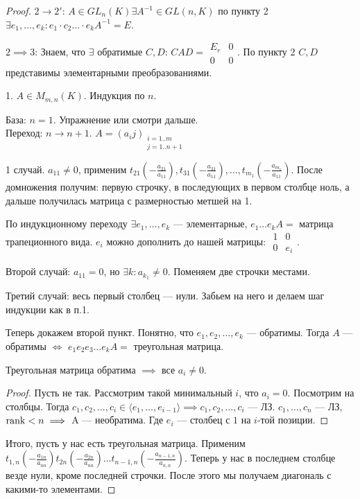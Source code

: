 \begin{proof}
    $2 \to 2'$:  $A \in GL_n(K) \exists A^{-1} \in GL(n, K)$ по пункту 2  $\exists e_1, \ldots, e_k\!: e_1 \cdot c_2 \ldots \cdot e_k A^{-1} = E$.

    $2 \implies 3$: Знаем, что  $\exists$ обратимые  $C, D$:  $CAD = \begin{array}{|c|c|} E_r & 0 \\ \hline 0 & 0 \end{array}$. По пункту 2  $C, D$ представимы элементарными преобразованиями. 

    1. $A \in M_{m, n}(K)$. Индукция по  $n$.

    База:  $n = 1$. Упражнение или смотри дальше.\\
    Переход:  $n \to n+1$.  $A = (a_ij)_{\substack{i = 1..m \\ j=1..{n+1}}}$

    1 случай. $a_{11} \neq 0$, применим $t_{21}(-\frac{a_{21}}{a_{11}}), t_{31}(-\frac{a_{31}}{a_{11}}),\ldots, t_{m_1}(-\frac{a_{m_1}}{a_{11}})$. После домножения получим: первую строчку, в последующих в первом столбце ноль, а дальше получилась матрица с размерностью метшей на 1.

    По индукционному переходу $\exists e_1, \ldots, e_k$ --- элементарные, $e_1 \ldots e_k A = $ матрица трапеционного вида. $e_i$ можно дополнить до нашей матрицы:  $\begin{array}{c|c} 1 & 0 \\ \hline 0 & e_i \end{array}$.

    Второй случай:  $a_{11} = 0$, но $\exists k\!: a_{k_1} \neq 0$. Поменяем две строчки местами.

    Третий случай: весь первый столбец --- нули. Забьем на него и делаем шаг индукции как в п.1.

    Теперь докажем второй пункт. Понятно, что $e_1, e_2, \ldots, e_k$ --- обратимы. Тогда $A$ --- обратимы  $\iff$  $e_1e_2e_3\ldots e_k A = $ треугольная матрица.

    \begin{statement}
        Треугольная матрица обратима $\implies$ все  $a_i \neq 0$.
    \end{statement}
    \begin{proof}
        Пусть не так. Рассмотрим такой минимальный $i$, что  $a_i = 0$. Посмотрим на столбцы. Тогда  $c_1, c_2, \ldots, c_i \in \langle e_1, \ldots, e_{i-1} \rangle \implies c_1, c_2, \ldots, c_i$ --- ЛЗ. $c_1,\ldots,c_n$ --- ЛЗ, $\operatorname{rank} < n \implies$ A --- необратима. Где $e_i$ --- столбец с  $1$ на  $i$-той позиции. 
    \end{proof}
    Итого, пусть у нас есть треугольная матрица. Применим $t_{1, n}(-\frac{a_{1n}}{a_{nn}})t_{2n}(-\frac{a_{2n}}{a_{nn}})\ldots t_{n-1,n}(-\frac{a_{n-1,n}}{a_{n,n}})$. Теперь у нас в последнем столбце везде нули, кроме последней строчки. После этого мы получаем диагональ с какими-то элементами.
\end{proof}
